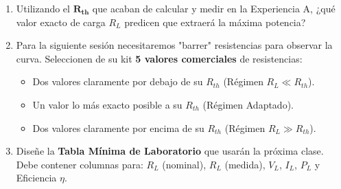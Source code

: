 \documentclass[11pt, a4paper]{article}
\begin{document}
\begin{enumerate}
    \item Utilizando el $\bm{R_{th}}$ que acaban de calcular y medir en la Experiencia A, ¿qué valor exacto de carga $R_L$ predicen que extraerá la máxima potencia?
    \item Para la siguiente sesión necesitaremos "barrer" resistencias para observar la curva. Seleccionen de su kit \textbf{5 valores comerciales} de resistencias:
    \begin{itemize}
        \item Dos valores claramente por debajo de su $R_{th}$ (Régimen $R_L \ll R_{th}$).
        \item Un valor lo más exacto posible a su $R_{th}$ (Régimen Adaptado).
        \item Dos valores claramente por encima de su $R_{th}$ (Régimen $R_L \gg R_{th}$).
    \end{itemize}
    \item Diseñe la \textbf{Tabla Mínima de Laboratorio} que usarán la próxima clase. Debe contener columnas para: $R_L$ (nominal), $R_L$ (medida), $V_L$, $I_L$, $P_L$ y Eficiencia $\eta$.
\end{enumerate}
\end{document}
